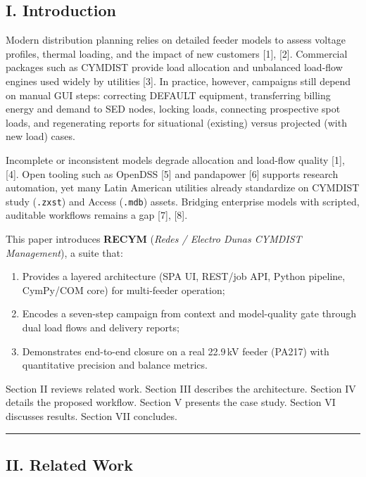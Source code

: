 \documentclass[
  11pt,
]{article}
\providecommand{\tightlist}{%
  \setlength{\itemsep}{0pt}\setlength{\parskip}{0pt}}
\begin{document}
\subsection{I. Introduction}\label{i.-introduction}

Modern distribution planning relies on detailed feeder models to assess
voltage profiles, thermal loading, and the impact of new customers
{[}1{]}, {[}2{]}. Commercial packages such as CYMDIST provide load
allocation and unbalanced load-flow engines used widely by utilities
{[}3{]}. In practice, however, campaigns still depend on manual GUI
steps: correcting DEFAULT equipment, transferring billing energy and
demand to SED nodes, locking loads, connecting prospective spot loads,
and regenerating reports for situational (existing) versus projected
(with new load) cases.

Incomplete or inconsistent models degrade allocation and load-flow
quality {[}1{]}, {[}4{]}. Open tooling such as OpenDSS {[}5{]} and
pandapower {[}6{]} supports research automation, yet many Latin American
utilities already standardize on CYMDIST study (\texttt{.zxst}) and
Access (\texttt{.mdb}) assets. Bridging enterprise models with scripted,
auditable workflows remains a gap {[}7{]}, {[}8{]}.

This paper introduces \textbf{RECYM} (\emph{Redes / Electro Dunas
CYMDIST Management}), a suite that:

\begin{enumerate}
\def\labelenumi{\arabic{enumi}.}
\tightlist
\item
  Provides a layered architecture (SPA UI, REST/job API, Python
  pipeline, CymPy/COM core) for multi-feeder operation;
\item
  Encodes a seven-step campaign from context and model-quality gate
  through dual load flows and delivery reports;
\item
  Demonstrates end-to-end closure on a real 22.9\,kV feeder (PA217) with
  quantitative precision and balance metrics.
\end{enumerate}

Section II reviews related work. Section III describes the architecture.
Section IV details the proposed workflow. Section V presents the case
study. Section VI discusses results. Section VII concludes.

\begin{center}\rule{0.5\linewidth}{0.5pt}\end{center}

\subsection{II. Related Work}\label{ii.-related-work}
\end{document}
